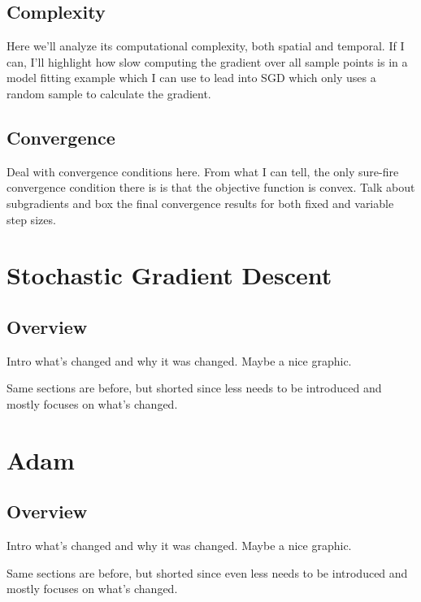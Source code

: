 \documentclass{article}
\begin{document}
\subsection*{Complexity}
  Here we'll analyze its computational complexity, both spatial and temporal. If I can, I'll highlight how slow computing the gradient over all sample points is in a model fitting example which I can use to lead into SGD which only uses a random sample to calculate the gradient.
  
\subsection*{Convergence}
  Deal with convergence conditions here. From what I can tell, the only sure-fire convergence condition there is is that the objective function is convex. Talk about subgradients and box the final convergence results for both fixed and variable step sizes. \cite{tibshirani_2013}

\section*{Stochastic Gradient Descent}
\subsection*{Overview}
Intro what's changed and why it was changed. Maybe a nice graphic.

Same sections are before, but shorted since less needs to be introduced and mostly focuses on what's changed.\cite{2019arXiv190303614Z} \cite{2016arXiv160904747R}

\section*{Adam}
\subsection*{Overview}
Intro what's changed and why it was changed. Maybe a nice graphic.

Same sections are before, but shorted since even less needs to be introduced and mostly focuses on what's changed.\cite{2019arXiv190303614Z} \cite{2016arXiv160904747R}



\end{document}
